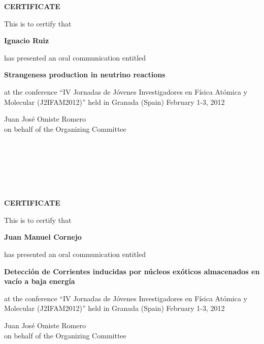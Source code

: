\documentclass [13pt,a4paper] {letter}
\begin{document}
\begin{verbatim}






\end{verbatim}
\pagestyle{empty}
\begin{center}
{\bf {\Huge CERTIFICATE}}

\vspace {1.5cm}
This is to certify that
\vspace {1cm}

{\bf \Large  Ignacio    Ruiz }
\vspace {1cm}

has presented an oral communication entitled
\vspace {1cm}

{\bf \large  Strangeness production in neutrino reactions }
\vspace {1cm}

at the conference { \textquotedblleft IV Jornadas de Jóvenes Investigadores en Física Atómica y Molecular (J2IFAM2012)\textquotedblright} 
held in Granada (Spain) February 1-3, 2012
\end{center}
\vspace {3cm}
\begin{raggedleft}
Juan José Omiste Romero\\
on behalf of the Organizing Committee
\newpage
\end{raggedleft}
\begin{verbatim}






\end{verbatim}
\pagestyle{empty}
\begin{center}
{\bf {\Huge CERTIFICATE}}

\vspace {1.5cm}
This is to certify that
\vspace {1cm}

{\bf \Large  Juan  Manuel  Cornejo }
\vspace {1cm}

has presented an oral communication entitled
\vspace {1cm}

{\bf \large  Detección de Corrientes inducidas por núcleos exóticos almacenados en vacío a baja energía }
\vspace {1cm}

at the conference { \textquotedblleft IV Jornadas de Jóvenes Investigadores en Física Atómica y Molecular (J2IFAM2012)\textquotedblright} 
held in Granada (Spain) February 1-3, 2012
\end{center}
\vspace {3cm}
\begin{raggedleft}
Juan José Omiste Romero\\
on behalf of the Organizing Committee
\newpage
\end{raggedleft}
\begin{verbatim}






\end{verbatim}
\end{document}
